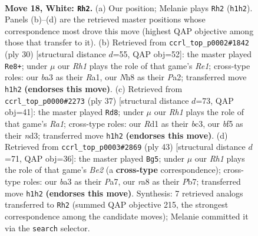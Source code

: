 \documentclass[11pt]{article}
\begin{document}
\clearpage

\begin{figure}[p]\centering
\begin{subfigure}{0.46\textwidth}\centering
\resizebox{\linewidth}{!}{%
\newchessgame
\chessboard[
  setfen={rnk3nN/1p6/4p3/pB1p1bpp/3p4/b6P/P1P2PP1/3RK2R w K - 0 18},
  showmover=false,
  pgfstyle=straightmove, color=movearrow, markmove={h1-h2}
]}
\caption{}
\end{subfigure}\hfill
\begin{subfigure}{0.46\textwidth}\centering
\resizebox{\linewidth}{!}{%
\newchessgame
\chessboard[
  setfen={r1b3k1/ppp3pp/3b2p1/3N2B1/3n4/5P2/PPP2P1P/R3R1K1 w - - 0 16},
  showmover=false,
  pgfstyle=straightmove, color=movearrow, markmove={e1-e8}
]}
\caption{}
\end{subfigure}
\\[4pt]
\begin{subfigure}{0.46\textwidth}\centering
\resizebox{\linewidth}{!}{%
\newchessgame
\chessboard[
  setfen={r5k1/pb2p2p/4nppb/2p5/4P3/P1BN1PP1/1P2K2P/5B1R b - - 0 19},
  showmover=false,
  pgfstyle=straightmove, color=movearrow, markmove={a8-d8}
]}
\caption{}
\end{subfigure}\hfill
\begin{subfigure}{0.46\textwidth}\centering
\resizebox{\linewidth}{!}{%
\newchessgame
\chessboard[
  setfen={4k2r/pp2bp2/4n2p/2p1p2P/4P1p1/4B1P1/PPP2PB1/3R2K1 b k - 0 22},
  showmover=false,
  pgfstyle=straightmove, color=movearrow, markmove={e7-g5}
]}
\caption{}
\end{subfigure}
\caption{\textbf{Move 18, White: \texttt{Rh2}.} (a) Our position; Melanie plays \texttt{Rh2} (\texttt{h1h2}). Panels (b)--(d) are the retrieved master positions whose correspondence most drove this move (highest QAP objective among those that transfer to it). (b) Retrieved from \texttt{ccrl\_top\_p0002\#1842} (ply 30) [structural distance $d$=55, QAP obj=52]: the master played \texttt{Re8+}; under $\mu$ our \emph{Rh1} plays the role of that game's \emph{Re1}; cross-type roles: our \emph{b}a3 as their \emph{R}a1, our \emph{N}h8 as their \emph{P}a2; transferred move \texttt{h1h2} \textbf{(endorses this move)}. (c) Retrieved from \texttt{ccrl\_top\_p0000\#2273} (ply 37) [structural distance $d$=73, QAP obj=41]: the master played \texttt{Rd8}; under $\mu$ our \emph{Rh1} plays the role of that game's \emph{Ra1}; cross-type roles: our \emph{R}d1 as their \emph{b}c3, our \emph{b}f5 as their \emph{n}d3; transferred move \texttt{h1h2} \textbf{(endorses this move)}. (d) Retrieved from \texttt{ccrl\_top\_p0003\#2869} (ply 43) [structural distance $d$=71, QAP obj=36]: the master played \texttt{Bg5}; under $\mu$ our \emph{Rh1} plays the role of that game's \emph{Be2} (a \textbf{cross-type} correspondence); cross-type roles: our \emph{b}a3 as their \emph{P}a7, our \emph{r}a8 as their \emph{P}b7; transferred move \texttt{h1h2} \textbf{(endorses this move)}. Synthesis: 7 retrieved analogs transferred to \texttt{Rh2} (summed QAP objective 215, the strongest correspondence among the candidate moves); Melanie committed it via the \texttt{search} selector.}
\label{fig:thought-m34}
\end{figure}
\end{document}
